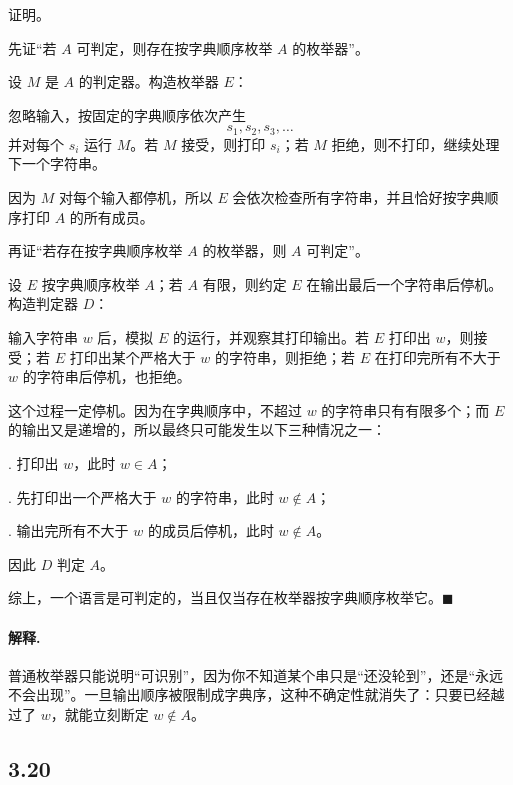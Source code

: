 \begin{answerred}
证明。

\medskip
\noindent
先证“若 $A$ 可判定，则存在按字典顺序枚举 $A$ 的枚举器”。

\medskip
设 $M$ 是 $A$ 的判定器。构造枚举器 $E$：

\medskip
\noindent
忽略输入，按固定的字典顺序依次产生
\[
    s_1,s_2,s_3,\dots
\]
并对每个 $s_i$ 运行 $M$。若 $M$ 接受，则打印 $s_i$；若 $M$ 拒绝，则不打印，继续处理下一个字符串。

\medskip
因为 $M$ 对每个输入都停机，所以 $E$ 会依次检查所有字符串，并且恰好按字典顺序打印 $A$ 的所有成员。

\medskip
\noindent
再证“若存在按字典顺序枚举 $A$ 的枚举器，则 $A$ 可判定”。

\medskip
设 $E$ 按字典顺序枚举 $A$；若 $A$ 有限，则约定 $E$ 在输出最后一个字符串后停机。构造判定器 $D$：

\medskip
\noindent
输入字符串 $w$ 后，模拟 $E$ 的运行，并观察其打印输出。若 $E$ 打印出 $w$，则接受；若 $E$ 打印出某个严格大于 $w$ 的字符串，则拒绝；若 $E$ 在打印完所有不大于 $w$ 的字符串后停机，也拒绝。

\medskip
这个过程一定停机。因为在字典顺序中，不超过 $w$ 的字符串只有有限多个；而 $E$ 的输出又是递增的，所以最终只可能发生以下三种情况之一：

\medskip
{}. 打印出 $w$，此时 $w\in A$；

\medskip
{}. 先打印出一个严格大于 $w$ 的字符串，此时 $w\notin A$；

\medskip
{}. 输出完所有不大于 $w$ 的成员后停机，此时 $w\notin A$。

\medskip
因此 $D$ 判定 $A$。

综上，一个语言是可判定的，当且仅当存在枚举器按字典顺序枚举它。$\blacksquare$

\begin{answernote}
\paragraph{解释.}
普通枚举器只能说明“可识别”，因为你不知道某个串只是“还没轮到”，还是“永远不会出现”。一旦输出顺序被限制成字典序，这种不确定性就消失了：只要已经越过了 $w$，就能立刻断定 $w\notin A$。

\end{answernote}
\end{answerred}
\subsection*{3.20}

